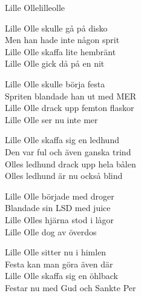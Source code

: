 \begin{song}{Lille Olle}{lilleolle}
\begin{vers}
Lille Olle skulle gå på disko\\
Men han hade inte någon sprit\\
Lille Olle skaffa lite hembränt\\
Lille Olle gick då på en nit\\
\end{vers}
\begin{vers}
Lille Olle skulle börja festa\\
Spriten blandade han ut med MER\\
Lille Olle drack upp femton flaskor\\
Lille Olle ser nu inte mer\\
\end{vers}
\begin{vers}
Lille Olle skaffa sig en ledhund\\
Den var ful och även ganska trind\\
Olles ledhund drack upp hela bålen\\
Olles ledhund är nu också blind\\
\end{vers}
\begin{vers}
Lille Olle började med droger\\
Blandade sin LSD med juice\\
Lille Olles hjärna stod i lågor\\
Lille Olle dog av överdos\\
\end{vers}
\begin{vers}
Lille Olle sitter nu i himlen\\
Festa kan man göra även där\\
Lille Olle skaffa sig en öhlback\\
Festar nu med Gud och Sankte Per\\
\end{vers}
\end{song}
